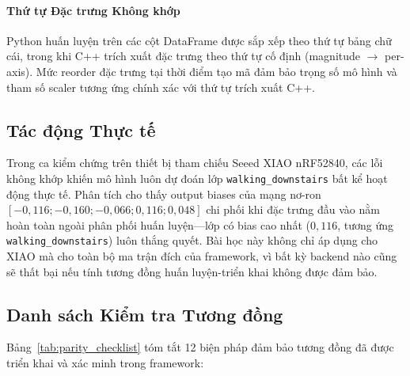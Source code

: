 \paragraph{Thứ tự Đặc trưng Không khớp}
Python huấn luyện trên các cột DataFrame được sắp xếp theo thứ tự bảng chữ cái, trong khi C++ trích xuất đặc trưng theo thứ tự cố định (magnitude $\rightarrow$ per-axis). Mức reorder đặc trưng tại thời điểm tạo mã đảm bảo trọng số mô hình và tham số scaler tương ứng chính xác với thứ tự trích xuất C++.

\subsection{Tác động Thực tế}
Trong ca kiểm chứng trên thiết bị tham chiếu Seeed XIAO nRF52840, các lỗi không khớp khiến mô hình luôn dự đoán lớp \texttt{walking\_downstairs} bất kể hoạt động thực tế. Phân tích cho thấy output biases của mạng nơ-ron $[-0{,}116; -0{,}160; -0{,}066; 0{,}116; 0{,}048]$ chi phối khi đặc trưng đầu vào nằm hoàn toàn ngoài phân phối huấn luyện---lớp có bias cao nhất ($0{,}116$, tương ứng \texttt{walking\_downstairs}) luôn thắng quyết. Bài học này không chỉ áp dụng cho XIAO mà cho toàn bộ ma trận đích của framework, vì bất kỳ backend nào cũng sẽ thất bại nếu tính tương đồng huấn luyện-triển khai không được đảm bảo.

\subsection{Danh sách Kiểm tra Tương đồng}
Bảng~\ref{tab:parity_checklist} tóm tắt 12 biện pháp đảm bảo tương đồng đã được triển khai và xác minh trong framework:

